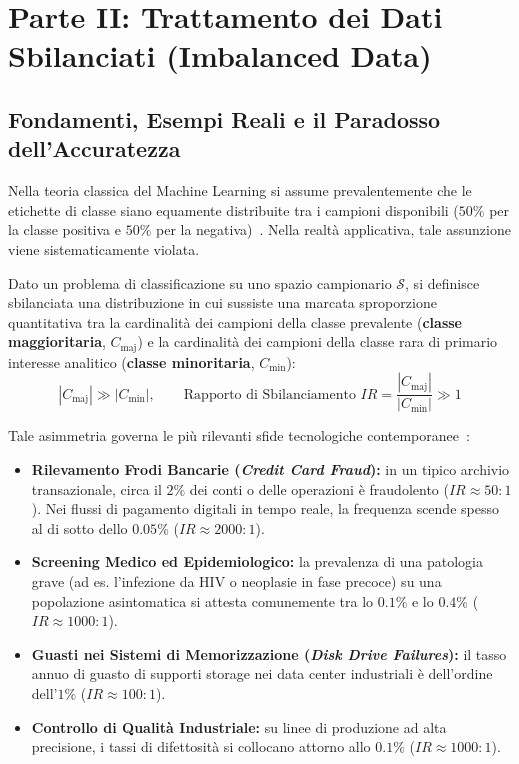 \section{Parte II: Trattamento dei Dati Sbilanciati (Imbalanced Data)}
\label{sec:dm-imbalanced-data}

\FloatBarrier
\subsection{Fondamenti, Esempi Reali e il Paradosso dell'Accuratezza}
\label{subsec:dm-imbalanced-paradox}

Nella teoria classica del Machine Learning si assume prevalentemente che le etichette di classe siano equamente distribuite tra i campioni disponibili ($50\%$ per la classe positiva e $50\%$ per la negativa)~\cite{tan2018}. Nella realtà applicativa, tale assunzione viene sistematicamente violata.

\begin{definition}
Dato un problema di classificazione su uno spazio campionario $\mathcal{S}$, si definisce sbilanciata una distribuzione in cui sussiste una marcata sproporzione quantitativa tra la cardinalità dei campioni della classe prevalente (\textbf{classe maggioritaria}, $C_{\text{maj}}$) e la cardinalità dei campioni della classe rara di primario interesse analitico (\textbf{classe minoritaria}, $C_{\text{min}}$):
\begin{equation}
    |C_{\text{maj}}| \gg |C_{\text{min}}|, \qquad \text{Rapporto di Sbilanciamento } IR = \frac{|C_{\text{maj}}|}{|C_{\text{min}}|} \gg 1
\end{equation}
\end{definition}

Tale asimmetria governa le più rilevanti sfide tecnologiche contemporanee~\cite{mannocci2026imbalanced}:
\begin{itemize}
    \item \textbf{Rilevamento Frodi Bancarie (\textit{Credit Card Fraud}):} in un tipico archivio transazionale, circa il $2\%$ dei conti o delle operazioni è fraudolento ($IR \approx 50:1$). Nei flussi di pagamento digitali in tempo reale, la frequenza scende spesso al di sotto dello $0.05\%$ ($IR \approx 2000:1$).
    \item \textbf{Screening Medico ed Epidemiologico:} la prevalenza di una patologia grave (ad es. l'infezione da HIV o neoplasie in fase precoce) su una popolazione asintomatica si attesta comunemente tra lo $0.1\%$ e lo $0.4\%$ ($IR \approx 1000:1$).
    \item \textbf{Guasti nei Sistemi di Memorizzazione (\textit{Disk Drive Failures}):} il tasso annuo di guasto di supporti storage nei data center industriali è dell'ordine dell'$1\%$ ($IR \approx 100:1$).
    \item \textbf{Controllo di Qualità Industriale:} su linee di produzione ad alta precisione, i tassi di difettosità si collocano attorno allo $0.1\%$ ($IR \approx 1000:1$).
\end{itemize}

